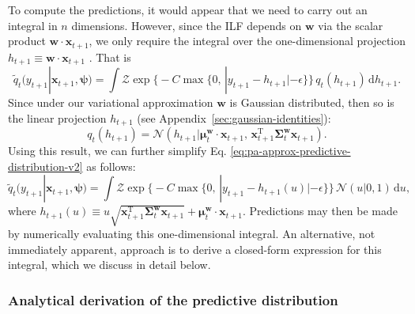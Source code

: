 To compute the predictions, it would appear that we need to carry out an integral in $n$ dimensions. However, since the ILF depends on $\mathbf{w}$ via the scalar product $\mathbf{w}\cdot\mathbf{x}_{t+1}$, we only require the integral over the one-dimensional projection $h_{t+1} \equiv \mathbf{w}\cdot\mathbf{x}_{t+1}$ \citep[Appendix~A.1]{barber-bishop}. That is
\begin{equation}
\label{eq:pa-approx-predictive-distribution-v2}
	\widetilde{q}_{t}(y_{t+1}|\mathbf{x}_{t+1}, \boldsymbol{\psi})
	= \int\mathcal{Z}\exp\Big\{-C\max\big\{0,\, |y_{t+1}-h_{t+1}|-\epsilon\big\}\Big\}\,q_{t}(h_{t+1})\,\mathrm{d}h_{t+1}.
\end{equation}
Since under our variational approximation $\mathbf{w}$ is Gaussian distributed, then so is the linear projection $h_{t+1}$ (see Appendix~\ref{sec:gaussian-identities}):
\begin{equation}
	q_{t}(h_{t+1})
	= \mathcal{N}(h_{t+1}|\boldsymbol{\mu}_{t}^\mathbf{w}\cdot\mathbf{x}_{t+1},\, \mathbf{x}_{t+1}^\text{T}\boldsymbol{\Sigma}_{t}^\mathbf{w}\mathbf{x}_{t+1}).
\end{equation}
Using this result, we can further simplify Eq. \eqref{eq:pa-approx-predictive-distribution-v2} as follows:
\begin{equation}
\label{eq:pa-approx-predictive-distribution-v3}
	\widetilde{q}_{t}(y_{t+1}|\mathbf{x}_{t+1}, \boldsymbol{\psi})
	= \int\mathcal{Z}\exp\Big\{-C\max\big\{0,\, |y_{t+1} - h_{t+1}(u)|-\epsilon\big\}\Big\}\,
	\mathcal{N}(u|0, 1)\,\mathrm{d}u,
\end{equation}
where $h_{t+1}(u) \equiv u\sqrt{\mathbf{x}_{t+1}^\text{T}\boldsymbol{\Sigma}_{t}^\mathbf{w}\mathbf{x}_{t+1}} + \boldsymbol{\mu}_{t}^\mathbf{w}\cdot\mathbf{x}_{t+1}$.
Predictions may then be made by numerically evaluating this one-dimensional integral. An alternative, not immediately apparent, approach is to derive a closed-form expression for this integral, which we discuss in detail below.

\subsubsection{Analytical derivation of the predictive distribution}

